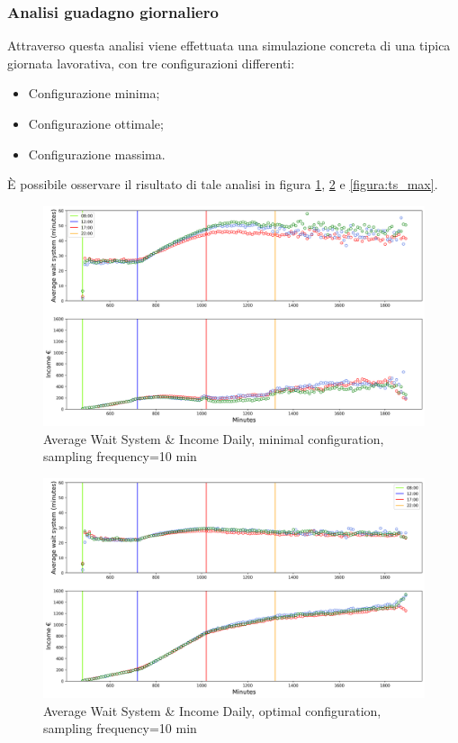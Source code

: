 \documentclass{article}
\begin{document}
\subsubsection{Analisi guadagno giornaliero}
Attraverso questa analisi viene effettuata una simulazione concreta di una tipica giornata lavorativa, con tre configurazioni differenti:
\begin{itemize}
	\item Configurazione minima;
	\item Configurazione ottimale;
	\item Configurazione massima.
\end{itemize} 
È possibile osservare il risultato di tale analisi in figura \ref{figura:ts_min}, \ref{figura:ts_optimal} e \ref{figura:ts_max}.
\begin{figure}[H]
	\centering
	\captionsetup{justification=centering,margin=2cm}
	\includegraphics[scale=0.48]{images/ts_min.png}
	\caption{Average Wait System \& Income Daily, minimal configuration, sampling frequency=10 min}\label{figura:ts_min}
\end{figure}
\begin{figure}[H]
	\centering
	\captionsetup{justification=centering,margin=2cm}
	\includegraphics[scale=0.48]{images/ts_optimal.png}
	\caption{Average Wait System \& Income Daily, optimal configuration, sampling frequency=10 min}\label{figura:ts_optimal}
\end{figure}
\end{document}
